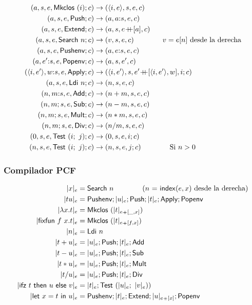 \documentclass[twoside,a4paper,12pt]{article}
\theoremstyle{definition}
\theoremstyle{remark}
\begin{document}
\begin{align*}
  (a, s, e, \Mkclos i; c)                   & \to (\thunk ie, s, e, c)    \\
  (a, s, e, \Push; c)                       & \to (a, a{\append}s, e, c)  \\
  (a, s, e, \Extend; c)                     & \to (a, s, e\concat [a], c) \\
  (a, s, e, \Search n; c)                   & \to (v, s, e, c)   \qquad\qquad v = e[n] \textrm{ desde la derecha}\\
  (a, s, e, \Pushenv; c)                    & \to (a, e{\append}s, e, c)  \\
  (a, e'{\append}s, e, \Popenv; c)          & \to (a, s, e',c)   \\
  (\thunk i{e'}, w{\append}s, e, \Apply; c) & \to (\thunk i{e'}, s, e'\concat [\thunk i{e'},w], i; c)\\
  (a, s, e, \Ldi n; c)                      & \to (n, s, e, c)    \\
  (n, m{\append}s, e, \Add; c)              & \to (n+m, s, e, c)  \\
  (n, m; s, e, \Sub; c)                     & \to (n-m, s, e, c)  \\
  (n, m; s, e, \Mult; c)                    & \to (n*m, s, e, c)  \\
  (n, m; s, e, \Div; c)                     & \to (n/m, s, e, c)  \\
  (0, s, e, \Test i j; c)                   & \to (0, s, e, i; c) \\
  (n, s, e, \Test i j; c)                   & \to (n, s, e,j; c) \qquad\qquad \textrm{Si }n>0 
\end{align*}

\subsubsection*{Compilador PCF}

\begin{align*}
  |x|_e           &= \Search n \qquad\qquad\textrm{($n$ = \s{index}$(e, x)$ desde la derecha)}\\
  |tu|_e          &= \Pushenv;  |u|_e; \Push;  |t|_e;  \Apply;  \Popenv\\
  |\fun xt|_e     &= \Mkclos {|t|_{e\concats[\_,x]}} \\
  |\fixfun fxt|_e &= \Mkclos {|t|_{e\concats[f,x]}}  \\
  |n|_e           &= \Ldi n \\
  |t+u|_e         &= |u|_e; \Push; |t|_e; \Add\\
  |t-u|_e         &= |u|_e; \Push; |t|_e; \Sub\\
  |t*u|_e         &= |u|_e; \Push; |t|_e; \Mult\\
  |t / u|_e       &= |u|_e; \Push; |t|_e; \Div\\
  |\ifz tuv|_e    &= |t|_e; \Test {|u|_e} {|v|_e})\\
  |\letl xtu|_e   &= \Pushenv;  |t|_e;  \Extend;  |u|_{e\concats [x]};  \Popenv
\end{align*}
\end{document}
